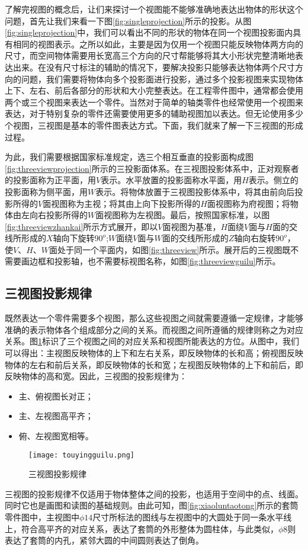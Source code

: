 了解完视图的概念后，让们来探讨一个视图能不能够准确地表达出物体的形状这个问题，首先让我们来看一下图\ref{fig:singleprojection}所示的投影。从图\ref{fig:singleprojection}中，我们可以看出不同的形状的物体在同一个视图投影面内具有相同的视图表示。之所以如此，主要是因为仅用一个视图只能反映物体两方向的尺寸，而空间物体需要用长宽高三个方向的尺寸帮能够将其大小形状完整清晰地表达出来。在没有尺寸标注的辅助的情况下，要解决投影只能够表达物体两个尺寸方向的问题，我们需要将物体向多个投影面进行投影，通过多个投影视图来实现物体上下、左右、前后各部分的形状和大小完整表达。在工程零件图中，通常都会使用两个或三个视图来表达一个零件。当然对于简单的轴类零件也经常使用一个视图来表达，对于特别复杂的零件还需要使用更多的辅助视图加以表达。但无论使用多少个视图，三视图是基本的零件图表达方式。下面，我们就来了解一下三视图的形成过程。




为此，我们需要根据国家标准规定，选三个相互垂直的投影面构成图\ref{fig:threeviewprojection}所示的三投影面体系。在三视图投影体系中，正对观察者的投影面称为正平面，用$V$表示。水平放置的投影面称水平面，用$H$表示。侧立的投影面称为侧平面，用$W$表示。将物体放置于三视图投影体系中，将其由前向后投影所得的$V$面视图称为主视；将其由上向下投影所得的$H$面视图称为府视图；将物体由左向右投影所得的$W$面视图称为左视图。最后，按照国家标准，以图\ref{fig:threeviewzhankai}所示方式展开，即以$V$面视图为基准，$H$面绕$V$面与$H$面的交线所形成的$X$轴向下旋转$90^o$;$W$面绕$V$面与$W$面的交线所形成的$Z$轴向右旋转$90^o$，使$V$、$H$、$W$面处于同一个平面内，如图\ref{fig:threeview}所示。展开后的三视图既不需要画边框和投影轴，也不需要标视图名称，如图\ref{fig:threeviewguilu}所示。

\subsection{三视图投影规律}
既然表达一个零件需要多个视图，那么这些视图之间就需要遵循一定规律，才能够准确的表示物体各个组成部分之间的关系。而视图之间所遵循的规律则称之为对应关系。图\ref{fig:threeviewguanxi}标识了三个视图之间的对应关系和视图所能表达的方位。从图中，我们可以得出：主视图反映物体的上下和左右关系，即反映物体的长和高；俯视图反映物体的左右和前后关系，即反映物体的长和宽；左视图反映物体的上下和前后，即反映物体的高和宽。因此，三视图的投影规律为：
\begin{itemize}
\item 主、俯视图长对正；
\item 主、左视图高平齐；
\item 俯、左视图宽相等。
\end{itemize}
\begin{figure}[htbp]
\texttt{[image: touyingguilu.png]}
\caption{三视图投影规律}\label{fig:threeviewguanxi}
\end{figure}

三视图的投影规律不仅适用于物体整体之间的投影，也适用于空间中的点、线面。同时它也是画图和读图的基础规则。由此可知，图\ref{fig:xiaoluntaotong}所示的套筒零件图中，主视图中$\phi 14$尺寸所标法的图线与左视图中的大圆处于同一条水平线上，符合高平齐的对应关系，表达了套筒的外形整体为圆柱体，与此类似，$\phi 8$则表达了套筒的内孔，紧邻大圆的中间圆则表达了倒角。

\endinput